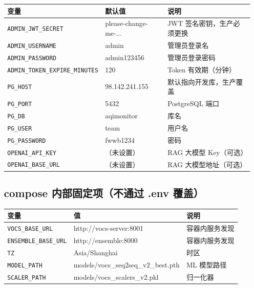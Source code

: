 \documentclass[UTF8,a4paper,11pt]{ctexart}
\begin{document}
\begin{longtable}{L{4.8cm} L{3.5cm} L{5.5cm}}
\toprule
\textbf{变量} & \textbf{默认值} & \textbf{说明} \\
\midrule
\endhead
\texttt{ADMIN\_JWT\_SECRET}            & please-change-me-...      & JWT 签名密钥，生产必须更换 \\
\texttt{ADMIN\_USERNAME}               & admin                     & 管理员登录名 \\
\texttt{ADMIN\_PASSWORD}               & admin123456               & 管理员登录密码 \\
\texttt{ADMIN\_TOKEN\_EXPIRE\_MINUTES} & 120                       & Token 有效期（分钟） \\
\texttt{PG\_HOST}                      & 98.142.241.155            & 默认指向开发库，生产覆盖 \\
\texttt{PG\_PORT}                      & 5432                      & PostgreSQL 端口 \\
\texttt{PG\_DB}                        & aqimonitor                & 库名 \\
\texttt{PG\_USER}                      & team                      & 用户名 \\
\texttt{PG\_PASSWORD}                  & fwwb1234                  & 密码 \\
\texttt{OPENAI\_API\_KEY}              & （未设置）                 & RAG 大模型 Key（可选） \\
\texttt{OPENAI\_BASE\_URL}             & （未设置）                 & RAG 大模型地址（可选） \\
\bottomrule
\end{longtable}

\subsection{compose 内部固定项（不通过 .env 覆盖）}

\begin{longtable}{L{4.8cm} L{4.5cm} L{4.0cm}}
\toprule
\textbf{变量} & \textbf{值} & \textbf{说明} \\
\midrule
\endhead
\texttt{VOCS\_BASE\_URL}     & http://vocs-server:8001 & 容器内服务发现 \\
\texttt{ENSEMBLE\_BASE\_URL} & http://ensemble:8000    & 容器内服务发现 \\
\texttt{TZ}                  & Asia/Shanghai           & 时区 \\
\texttt{MODEL\_PATH}         & models/vocs\_seq2seq\_v2\_best.pth & ML 模型路径 \\
\texttt{SCALER\_PATH}        & models/vocs\_scalers\_v2.pkl       & 归一化器 \\
\bottomrule
\end{longtable}
\end{document}
